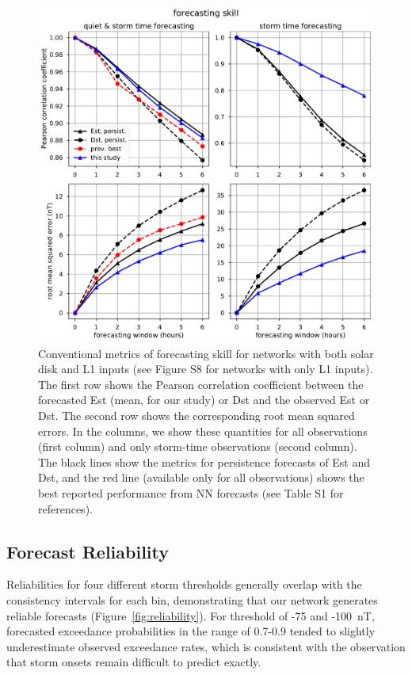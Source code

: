 \documentclass[draft,linenumbers]{agujournal2018}
\begin{document}
\begin{figure}[htbp]
  \centering
  \includegraphics[width=1.0\textwidth]{skill_comparison.pdf} 
  \caption{Conventional metrics of forecasting skill for networks with both solar disk and L1 inputs (see Figure S8 for networks with only L1 inputs). The first row shows the Pearson correlation coefficient between the forecasted Est (mean, for our study) or Dst and the observed Est or Dst. The second row shows the corresponding root mean squared errors. In the columns, we show these quantities for all observations (first column) and only storm-time observations (second column). The black lines show the metrics for persistence forecasts of Est and Dst, and the red line (available only for all observations) shows the best reported performance from NN forecasts (see Table S1 for references).}
  \label{fig:skill}
\end{figure}


\subsection{Forecast Reliability}

Reliabilities for four different storm thresholds generally overlap with the consistency intervals for each bin, demonstrating that our network generates reliable forecasts (Figure~\ref{fig:reliability}). For threshold of -75 and -100~nT, forecasted exceedance probabilities in the range of 0.7-0.9 tended to slightly underestimate observed exceedance rates, which is consistent with the observation that storm onsets remain difficult to predict exactly.
\end{document}
